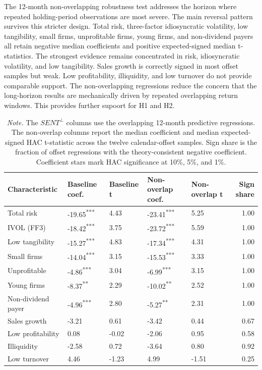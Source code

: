 \documentclass[11pt]{article}
\newcommand{\var}[1]{\ensuremath{#1}}
\newcommand{\tablenote}[1]{\caption*{\footnotesize \textit{Note.} #1}}
\begin{document}
The 12-month non-overlapping robustness test addresses the horizon where repeated holding-period observations are most severe. The main reversal pattern survives this stricter design. Total risk, three-factor idiosyncratic volatility, low tangibility, small firms, unprofitable firms, young firms, and non-dividend payers all retain negative median coefficients and positive expected-signed median t-statistics. The strongest evidence remains concentrated in risk, idiosyncratic volatility, and low tangibility. Sales growth is correctly signed in most offset samples but weak. Low profitability, illiquidity, and low turnover do not provide comparable support. The non-overlapping regressions reduce the concern that the long-horizon results are mechanically driven by repeated overlapping return windows. This provides further supoort for H1 and H2.

\begin{table}[H]
    \centering
    \caption{Persistence robustness: 12-month non-overlapping horizon regressions}
    \label{tab:nonoverlap_robustness}
    \small
    \begin{tabular}{lllllr}
        \toprule
        Characteristic & Baseline coef. & Baseline t & Non-overlap coef. & Non-overlap t & Sign share \\
        \midrule
        Total risk & -19.65\textsuperscript{***} & 4.43 & -23.41\textsuperscript{***} & 5.25 & 1.00 \\
        IVOL (FF3) & -18.42\textsuperscript{***} & 3.75 & -23.72\textsuperscript{***} & 5.59 & 1.00 \\
        Low tangibility & -15.27\textsuperscript{***} & 4.83 & -17.34\textsuperscript{***} & 4.31 & 1.00 \\
        Small firms & -14.04\textsuperscript{***} & 3.15 & -15.53\textsuperscript{***} & 3.33 & 1.00 \\
        Unprofitable & -4.86\textsuperscript{***} & 3.04 & -6.99\textsuperscript{***} & 3.15 & 1.00 \\
        Young firms & -8.37\textsuperscript{**} & 2.29 & -10.02\textsuperscript{**} & 2.52 & 1.00 \\
        Non-dividend payer & -4.96\textsuperscript{***} & 2.80 & -5.27\textsuperscript{**} & 2.31 & 1.00 \\
        Sales growth & -3.21 & 0.61 & -3.42 & 0.44 & 0.67 \\
        Low profitability & 0.08 & -0.02 & -2.06 & 0.95 & 0.58 \\
        Illiquidity & -2.58 & 0.72 & -3.64 & 0.80 & 0.92 \\
        Low turnover & 4.46 & -1.23 & 4.99 & -1.51 & 0.25 \\
        \bottomrule
    \end{tabular}
    \tablenote{The \var{SENT^{\perp}} columns use the overlapping 12-month predictive regressions. The non-overlap columns report the median coefficient and median expected-signed HAC t-statistic across the twelve calendar-offset samples. Sign share is the fraction of offset regressions with the theory-consistent negative coefficient. Coefficient stars mark HAC significance at 10\%, 5\%, and 1\%.}
\end{table}
\end{document}
